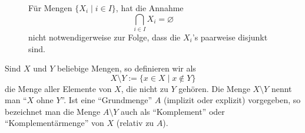 \begin{figure}[h]
   \begin{rk}\label{rk:disjunkt-paarweisedisjunkt}
       Für Mengen $\{X_i\mid i \in I \}$, hat die Annahme
       \[
           \bigcap_{i\in I}X_i=\varnothing
       \]
       nicht notwendigerweise zur Folge, dass die $X_i$'s paarweise disjunkt sind.
        \begin{center}
            \begin{framed}
                \def\firstcircle{(-4.5,2) circle (0.5cm)}
                \def\secondcircle{(-5.4,2) circle (0.5cm)}
                \def\thirdcircle{(-7,2) circle (0.5cm)}
                \def\firstcircleA{(0,2) circle (0.5cm)}
                \def\secondcircleA{(1.1,2) circle (0.5cm)}
                \def\thirdcircleA{(2.2,2) circle (0.5cm)}


                \setlength{\parskip}{5mm}
            \end{framed}
        \end{center}
    \end{rk}
\end{figure}


\begin{df}
 Sind $X$ und $Y$ beliebige Mengen, so definieren wir als
 \[
 X\setminus Y:=\{x\in X\mid x\notin Y\}
 \]
die Menge aller Elemente von $X$, die nicht zu $Y$ gehören. Die Menge $X\setminus Y$ nennt man ``$X$ ohne $Y$''. Ist eine ``Grundmenge'' $A$ (implizit oder explizit) vorgegeben, so bezeichnet man die Menge $A\setminus Y$ auch als ``Komplement'' oder ``Komplementärmenge'' von $X$ (relativ zu $A$).
\end{df}

